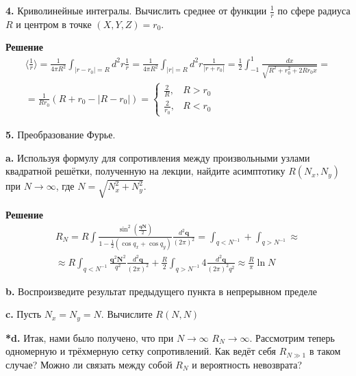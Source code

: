 \documentclass[a4paper,12pt]{article}
\begin{document}
\textbf{4.} Криволинейные интегралы. Вычислить среднее от функции $\frac{1}{r}$ по сфере радиуса $R$ и центром в точке $(X,Y,Z)=r_0$.

\textbf{Решение} 
\begin{eqnarray}
\langle\frac{1}{r}\rangle=\frac{1}{4\pi R^2}\int_{|r-r_0|=R}d^2r\frac{1}{r}=\frac{1}{4\pi R^2}\int_{|r|=R}d^2r\frac{1}{|r+r_0|}=\frac{1}{2}\int_{-1}^{1}\frac{dx}{\sqrt{R^2+r_0^2+2Rr_0 x}}={}
	\nonumber\\
{}=\frac{1}{Rr_0}\left(R+r_0-|R-r_0|\right)=\begin{cases} \frac{2}{R}, & R>r_0\\
\frac{2}{r_0}, & R<r_0 \end{cases}
\end{eqnarray}

\textbf{5.} Преобразование Фурье. 

\textbf{a.} Используя формулу для сопротивления между произвольными узлами квадратной решётки, полученную на лекции, найдите асимптотику $R(N_x, N_y)$ при $N\to\infty$, где $N=\sqrt{N_x^2+N_y^2}$.

\textbf{Решение}
\begin{eqnarray}
R_{N}=R\int\frac{\sin^2\left(\frac{\bm q \bm N}{2}\right)}{1-\frac{1}{2}\left(\cos q_x+\cos q_y\right)}\frac{d^2 \bm q}{(2\pi)^2}=\int_{q<N^{-1}}+\int_{q>N^{-1}}\approx{}
									\nonumber\\
{}\approx R\int_{q<N^{-1}}\frac{\bm q^2 \bm N^2}{q^2}\frac{d^2\bm q}{(2\pi)^2}+\frac{R}{2}\int_{q>N^{-1}}4\frac{d^2 \bm q}{(2\pi)^2 q^2}\approx\frac{R}{\pi}\ln N
\end{eqnarray}

\textbf{b.} Воспроизведите результат предыдущего пункта в непрерывном пределе

\textbf{c.} Пусть $N_x=N_y=N$. Вычислите $R(N,N)$

\textbf{*d.} Итак, нами было получено, что при $N\to\infty$ $R_N\to\infty$. Рассмотрим теперь одномерную и трёхмерную сетку сопротивлений. Как ведёт себя $R_{N\gg 1}$ в таком случае? Можно ли связать между собой $R_N$ и вероятность невозврата? 
\end{document}
